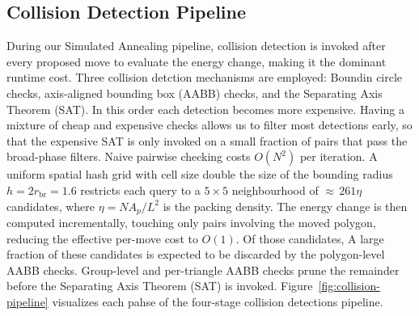 \documentclass[10pt]{article}
\begin{document}
\subsection{Collision Detection Pipeline}

During our Simulated Annealing pipeline,
 collision detection is invoked after every proposed move to evaluate
the energy change, making it the dominant runtime cost. Three collision detction
mechanisms are employed: Boundin circle checks,
 axis-aligned bounding box (AABB) checks,
  and the Separating Axis Theorem (SAT).
  In this order each detection becomes more expensive.
  Having a mixture of cheap and expensive checks allows us to 
  filter most detections early, so that the expensive SAT is only invoked on a small
   fraction of pairs that pass the broad-phase filters.
Naive pairwise checking costs $O(N^2)$ per iteration. 
A uniform spatial hash grid
with cell size double the size of the bounding radius $h = 2r_{\mathrm{br}} = 1.6$ restricts each query to a
$5 \times 5$ neighbourhood of ${\approx}\,261\eta$ candidates, where
$\eta = NA_p/L^2$ is the packing density. The energy change is then
computed incrementally, touching only pairs involving the moved
polygon, reducing the effective per-move cost to $O(1)$. Of those
candidates, A large fraction of these candidates is expected to be discarded by the
polygon-level AABB checks. Group-level and per-triangle
AABB checks prune the remainder before the Separating Axis Theorem
(SAT) is invoked. Figure~\ref{fig:collision-pipeline} visualizes
 each pahse of the
four-stage collision detections pipeline.
\end{document}
